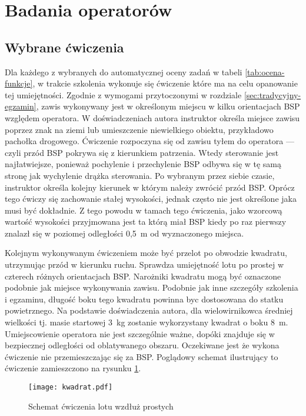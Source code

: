 \newpage
\section{Badania operatorów}

\subsection{Wybrane ćwiczenia}
Dla każdego z wybranych do automatycznej oceny zadań w tabeli \ref{tab:ocena-funkcje}, w trakcie szkolenia wykonuje się ćwiczenie które ma na celu opanowanie tej umiejętności. Zgodnie z wymogami przytoczonymi w rozdziale \ref{sec:tradycyjny-egzamin}, zawis wykonywany jest w określonym miejscu w kilku orientacjach BSP względem operatora. W doświadczeniach autora instruktor określa miejsce zawisu poprzez znak na ziemi lub umieszczenie niewielkiego obiektu, przykładowo pachołka drogowego. Ćwiczenie rozpoczyna się od zawisu tyłem do operatora --- czyli przód BSP pokrywa się z kierunkiem patrzenia. Wtedy sterowanie jest najłatwiejsze, ponieważ pochylenie i przechylenie BSP odbywa się w tę samą stronę jak wychylenie drążka sterowania. Po wybranym przez siebie czasie, instruktor określa kolejny kierunek w którym należy zwrócić przód BSP. Oprócz tego ćwiczy się zachowanie stałej wysokości, jednak często nie jest określone jaka musi być dokładnie. Z tego powodu w tamach tego ćwiczenia, jako wzorcową wartość wysokości przyjmowana jest ta którą miał BSP kiedy po raz pierwszy znalazł się w poziomej odległości 0,5~m od wyznaczonego miejsca.

Kolejnym wykonywanym ćwiczeniem może być przelot po obwodzie kwadratu, utrzymując przód w kierunku ruchu. Sprawdza umiejętność lotu po prostej w czterech różnych orientacjach BSP. Narożniki kwadratu mogą być oznaczone podobnie jak miejsce wykonywania zawisu. Podobnie jak inne szczegóły szkolenia i egzaminu, długość boku tego kwadratu powinna byc dostosowana do statku powietrznego. Na podstawie doświadczenia autora, dla wielowirnikowca średniej wielkości tj. masie startowej 3~kg zostanie wykorzystany kwadrat o boku 8~m. Umiejscowienie operatora nie jest szczególnie ważne, dopóki znajduje się w bezpiecznej odległości od oblatywanego obszaru. Oczekiwane jest że wykona ćwiczenie nie przemieszczając się za BSP. Poglądowy schemat ilustrujący to ćwiczenie zamieszczono na rysunku \ref{fig:kwadrat}.

\begin{figure}[!h]
    \centering \texttt{[image: kwadrat.pdf]}
    \caption{Schemat ćwiczenia lotu wzdłuż prostych}
    \label{fig:kwadrat}
\end{figure}

